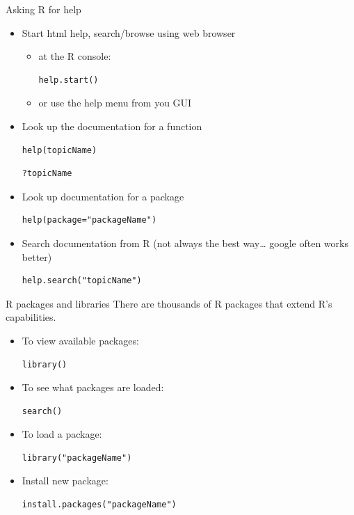 \documentclass[table,smaller]{beamer}
\begin{document}
\begin{frame}[fragile,label=sec-4-1]{Asking R for help}
 \begin{itemize}
\item Start html help, search/browse using web browser
\begin{itemize}
\item at the R console:
\begin{verbatim}
help.start()
\end{verbatim}

\item or use the help menu from you GUI
\end{itemize}

\item Look up the documentation for a function
\begin{verbatim}
help(topicName)
\end{verbatim}

\begin{verbatim}
?topicName
\end{verbatim}

\item Look up documentation for a package
\begin{verbatim}
help(package="packageName")
\end{verbatim}

\item Search documentation from R (not always the best way\ldots{} google often works better)
\begin{verbatim}
help.search("topicName")
\end{verbatim}
\end{itemize}
\end{frame}

\begin{frame}[fragile,label=sec-4-2]{R packages and libraries}
 There are thousands of R packages that extend R's capabilities.

\begin{itemize}
\item To view available packages: 
\begin{verbatim}
library()
\end{verbatim}

\item To see what packages are loaded: 
\begin{verbatim}
search()
\end{verbatim}

\item To load a package: 
\begin{verbatim}
library("packageName")
\end{verbatim}

\item Install new package: 
\begin{verbatim}
install.packages("packageName")
\end{verbatim}
\end{itemize}
\end{frame}
\end{document}
